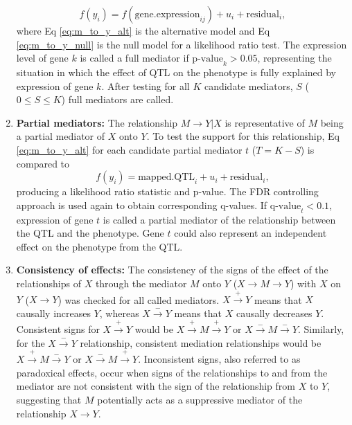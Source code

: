 \begin{enumerate}
\begin{equation}
   	f(y_{i}) = f(\text{gene.expression}_{ij}) + u_i + \text{residual}_{i},
    \label{eq:m_to_y_null}
   \end{equation}
    where Eq \ref{eq:m_to_y_alt} is the alternative model and Eq \ref{eq:m_to_y_null} is the null model for a likelihood ratio test. The expression level of gene $k$ is called a full mediator if $\text{p-value}_{k} > 0.05$, representing the situation in which the effect of QTL on the phenotype is fully explained by expression of gene $k$. After testing for all $K$ candidate mediators, $S$ ($0 \leq S \leq K$) full mediators are called.
    \item \textbf{Partial mediators:} The relationship $M \rightarrow Y | X$ is representative of $M$ being a partial mediator of $X$ onto $Y$. To test the support for this relationship, Eq \ref{eq:m_to_y_alt} for each candidate partial mediator $t$ ($T = K - S$) is compared to
    \begin{equation}
    	f(y_{i}) = \text{mapped.QTL}_{i} + u_i + \text{residual}_{i},
        \label{eq:five}
    \end{equation}
	producing a likelihood ratio statistic and p-value. The FDR controlling approach is used again to obtain corresponding q-values. If $\text{q-value}_{t} < 0.1$, expression of gene $t$ is called a partial mediator of the relationship between the QTL and the phenotype. Gene $t$ could also represent an independent effect on the phenotype from the QTL.
    \item \textbf{Consistency of effects:} The consistency of the signs of the effect of the relationships of $X$ through the mediator $M$ onto $Y$ ($X \rightarrow M \rightarrow Y$) with $X$ on $Y$ ($X \rightarrow Y$) was checked for all called mediators. $X \stackrel{+}\rightarrow Y$ means that $X$ causally increases $Y$, whereas $X \stackrel{-}\rightarrow Y$ means that $X$ causally decreases $Y$. Consistent signs for $X \stackrel{+}\rightarrow Y$ would be $X \stackrel{+}\rightarrow M \stackrel{+}\rightarrow Y$ or $X \stackrel{-}\rightarrow M \stackrel{-}\rightarrow Y$. Similarly, for the $X \stackrel{-}\rightarrow Y$ relationship, consistent mediation relationships would be $X \stackrel{+}\rightarrow M \stackrel{-}\rightarrow Y$ or $X \stackrel{-}\rightarrow M \stackrel{+}\rightarrow Y$. Inconsistent signs, also referred to as paradoxical effects, occur when signs of the relationships to and from the mediator are not consistent with the sign of the relationship from $X$ to $Y$, suggesting that $M$ potentially acts as a suppressive mediator of the relationship $X \rightarrow Y$.
\end{enumerate}

